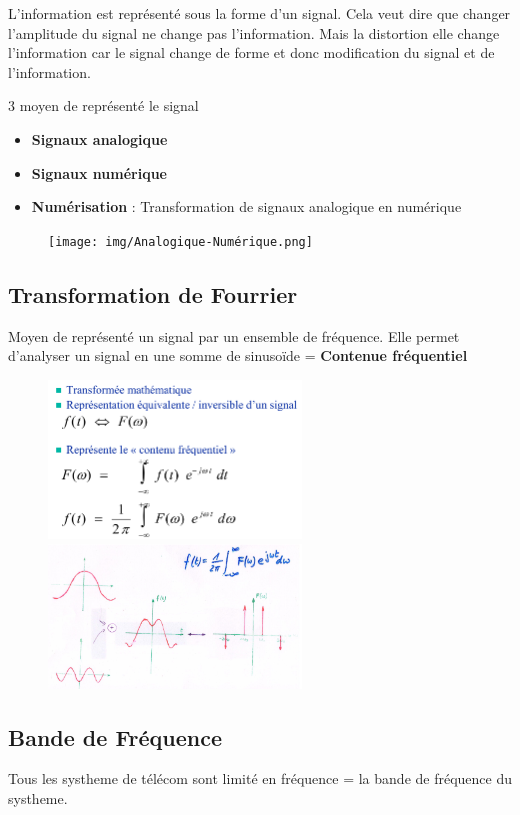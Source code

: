\documentclass[12pt]{article}
\begin{document}
	
	L'information est représenté sous la forme d'un signal. Cela veut dire que changer l'amplitude du signal ne change pas l'information. Mais la distortion elle change l'information car le signal change de forme et donc modification du signal et de l'information.
	
	3 moyen de représenté le signal
	\begin{itemize}
		\item \textbf{Signaux analogique}
		\item \textbf{Signaux numérique}
		\item \textbf{Numérisation} : Transformation de signaux analogique en numérique
	\end{itemize}
		\begin{figure}[htp]
			\centering
			\texttt{[image: img/Analogique-Numérique.png]}
		\end{figure}
		
	\subsection{Transformation de Fourrier}
		Moyen de représenté un signal par un ensemble de fréquence. Elle permet d'analyser un signal en une somme de sinusoïde = \textbf{Contenue fréquentiel}
		\begin{figure}[htp]
			\centering
			\includegraphics[width=0.6\textwidth]{img/Fourrier.png}
			\includegraphics[width=0.6\textwidth]{img/FourrierExemple.png}
		\end{figure}
		
	\subsection{Bande de Fréquence}
		Tous les systheme de télécom sont limité en fréquence = la bande de fréquence du systheme.
		
\end{document}
